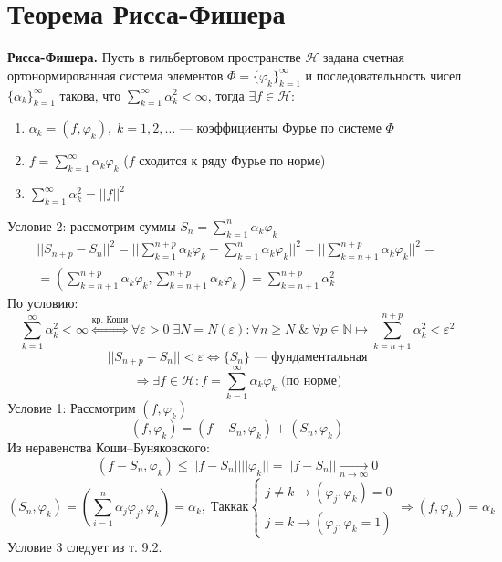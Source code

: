\section{Теорема Рисса-Фишера}
\begin{greyTheorem}\textbf{Рисса-Фишера.}
	Пусть в гильбертовом пространстве  $ \mathcal{H} $ задана счетная ортонормированная система элементов $ \Phi = \{ \varphi_k \}_{k=1}^\infty $ и последовательность чисел $ \{ \alpha_k \}_{k=1}^\infty $ такова, что $ \sum_{k=1}^\infty \alpha_k^2 < \infty $, тогда $ \exists f \in \mathcal{H}: $
	\begin{enumerate}
		\item $ \alpha_k = (f,\varphi_k),\; k = 1,2,\ldots $ --- коэффициенты Фурье по системе $ \Phi $
		\item $ f = \sum_{k=1}^\infty \alpha_k \varphi_k $ ($ f $ сходится к ряду Фурье по норме)
		\item $ \sum_{k=1}^\infty \alpha_k^2 = ||f||^2 $
	\end{enumerate}
\end{greyTheorem}
\begin{greyProof}
	Условие 2: рассмотрим суммы $ S_n = \sum_{k=1}^n \alpha_k \varphi_k $
	\begin{multline*}
		|| S_{n+p} - S_n ||^2 = ||\sum_{k=1}^{n+p}\alpha_k\varphi_k - \sum_{k=1}^n \alpha_k \varphi_k ||^2= || \sum_{k=n+1}^{n+p} \alpha_k \varphi_k ||^2 =\\= \left(\sum_{k=n+1}^{n+p} \alpha_k \varphi_k, \sum_{k=n+1}^{n+p} \alpha_k \varphi_k\right) = \sum_{k=n+1}^{n+p}\alpha_k ^2
	\end{multline*}
	По условию:
	\[
		\sum_{k=1}^\infty \alpha_k^2 < \infty \overset{\text{кр. Коши}}{\Leftrightarrow} \forall \varepsilon>0 \;\exists N=N(\varepsilon): \forall n\geqslant N\; \&\; \forall p \in \mathbb{N} 	\mapsto \sum_{k=n+1}^{n+p}\alpha_k^2 < \varepsilon^2
	\]
	\[
		||S_{n+p} - S_n || <\varepsilon \Leftrightarrow \{ S_n \}\text{ --- фундаментальная}
	\]
	\[
		\Rightarrow \exists f \in \mathcal{H}: f = \sum_{k=1}^\infty \alpha_k \varphi_k \text{ (по норме)}
	\]
	Условие 1: Рассмотрим $ (f,\varphi_k) $ $$ (f, \varphi_k) = (f-S_n, \varphi_k) + (S_n, \varphi_k)$$
		Из неравенства Коши--Буняковского:
	\[
		(f-S_n, \varphi_k) \leqslant ||f-S_n||||\varphi_k|| = ||f-S_n|| \underset{n\rightarrow\infty}{\longrightarrow}0
	\]
	\[
		(S_n, \varphi_k)= \left( \sum_{i=1}^n\alpha_j\varphi_j,\varphi_k \right) = \alpha_k,\; 
	Так как \begin{cases}
		j \neq k \rightarrow (\varphi_j,\varphi_k) = 0\\ j = k \rightarrow (\varphi_j,\varphi_k = 1)
	\end{cases} \Rightarrow (f,\varphi_k) = \alpha_k\]
	Условие 3 следует из т. 9.2.
\end{greyProof}
